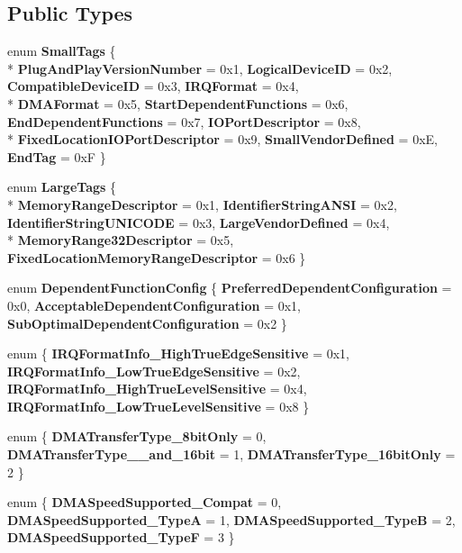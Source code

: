 \subsection*{Public Types}
\begin{DoxyCompactItemize}
\item 
enum {\bfseries Small\-Tags} \{ \\*
{\bfseries Plug\-And\-Play\-Version\-Number} =  0x1, 
{\bfseries Logical\-Device\-I\-D} =  0x2, 
{\bfseries Compatible\-Device\-I\-D} =  0x3, 
{\bfseries I\-R\-Q\-Format} =  0x4, 
\\*
{\bfseries D\-M\-A\-Format} =  0x5, 
{\bfseries Start\-Dependent\-Functions} =  0x6, 
{\bfseries End\-Dependent\-Functions} =  0x7, 
{\bfseries I\-O\-Port\-Descriptor} =  0x8, 
\\*
{\bfseries Fixed\-Location\-I\-O\-Port\-Descriptor} =  0x9, 
{\bfseries Small\-Vendor\-Defined} =  0x\-E, 
{\bfseries End\-Tag} =  0x\-F
 \}
\item 
enum {\bfseries Large\-Tags} \{ \\*
{\bfseries Memory\-Range\-Descriptor} =  0x1, 
{\bfseries Identifier\-String\-A\-N\-S\-I} =  0x2, 
{\bfseries Identifier\-String\-U\-N\-I\-C\-O\-D\-E} =  0x3, 
{\bfseries Large\-Vendor\-Defined} =  0x4, 
\\*
{\bfseries Memory\-Range32\-Descriptor} =  0x5, 
{\bfseries Fixed\-Location\-Memory\-Range\-Descriptor} =  0x6
 \}
\item 
enum {\bfseries Dependent\-Function\-Config} \{ {\bfseries Preferred\-Dependent\-Configuration} =  0x0, 
{\bfseries Acceptable\-Dependent\-Configuration} =  0x1, 
{\bfseries Sub\-Optimal\-Dependent\-Configuration} =  0x2
 \}
\item 
enum \{ {\bfseries I\-R\-Q\-Format\-Info\-\_\-\-High\-True\-Edge\-Sensitive} =  0x1, 
{\bfseries I\-R\-Q\-Format\-Info\-\_\-\-Low\-True\-Edge\-Sensitive} =  0x2, 
{\bfseries I\-R\-Q\-Format\-Info\-\_\-\-High\-True\-Level\-Sensitive} =  0x4, 
{\bfseries I\-R\-Q\-Format\-Info\-\_\-\-Low\-True\-Level\-Sensitive} =  0x8
 \}
\item 
enum \{ {\bfseries D\-M\-A\-Transfer\-Type\-\_\-8bit\-Only} = 0, 
{\bfseries D\-M\-A\-Transfer\-Type\-\_\-\_\-and\-\_\-16bit} = 1, 
{\bfseries D\-M\-A\-Transfer\-Type\-\_\-16bit\-Only} = 2
 \}
\item 
enum \{ {\bfseries D\-M\-A\-Speed\-Supported\-\_\-\-Compat} = 0, 
{\bfseries D\-M\-A\-Speed\-Supported\-\_\-\-Type\-A} = 1, 
{\bfseries D\-M\-A\-Speed\-Supported\-\_\-\-Type\-B} = 2, 
{\bfseries D\-M\-A\-Speed\-Supported\-\_\-\-Type\-F} = 3
 \}
\end{DoxyCompactItemize}
